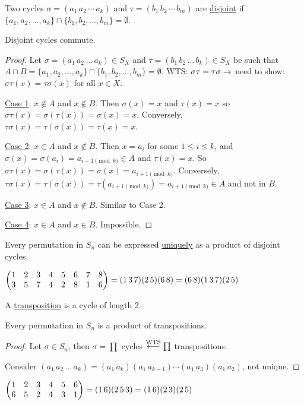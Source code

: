 \documentclass[]{article}
\begin{document}
\begin{definition}
	Two cycles $\sigma = (a_1\, a_2\,\cdots\, a_k)$ and $\tau = (b_1\,b_2\,\cdots\,b_m)$ are \ul{disjoint} if $\{a_1,a_2,\dots,a_k\}\cap \{b_1,b_2,\dots,b_m\} = \emptyset$.
\end{definition}

\begin{proposition}
	Disjoint cycles commute.
\end{proposition}
\begin{proof}
	Let $\sigma = (a_1\,a_2\,\dots\,a_k)\in S_X$ and $\tau = (b_1\,b_2\,\dots\,b_k)\in S_X$ be such that $A\cap B = \{a_1,a_2,\dots,a_k\}\cap \{b_1,b_2,\dots,b_m\} = \emptyset$.
	WTS: $\sigma\tau = \tau\sigma \rightarrow$ need to show: $\sigma\tau(x) = \tau\sigma(x)$ for all $x\in X$.

	\ul{Case 1}: $x\notin A$ and $x\notin B$. Then $\sigma(x) = x$ and $\tau(x) = x$ so $\sigma\tau(x) = \sigma(\tau(x)) = \sigma(x) = x$. Conversely, $\tau\sigma(x) = \tau(\sigma(x)) = \tau(x) = x$.

	\ul{Case 2}: $x\in A$ and $x\notin B$. Then $x = a_i$ for some $1\leq i\leq k$, and $\sigma(x) = \sigma(a_i) = a_{i+1\pmod k}\in A$ and $\tau(x) = x$. So $\sigma\tau(x) = \sigma(\tau(x)) = \sigma(x) = a_{i+1\pmod k}$. Conversely, $\tau\sigma(x) = \tau(\sigma(x)) = \tau(a_{i+1\pmod k}) = a_{i+1\pmod k}\in A$ and not in $B$.

	\ul{Case 3}: $x\in A$ and $x\notin B$. Similar to Case 2.

	\ul{Case 4}: $x\in A$ and $x\in B$. Impossible.
\end{proof}

\begin{theorem}
	Every permutation in $S_n$ can be expressed \ul{uniquely} as a product of disjoint cycles.
\end{theorem}
\begin{example}
	$\begin{pmatrix}1&2&3&4&5&6&7&8\\3&5&7&4&2&8&1&6\end{pmatrix} = (1\,3\,7)(2\,5)(6\,8) = (6\,8)(1\,3\,7)(2\,5)$
\end{example}
\begin{definition}
	A \ul{transposition} is a cycle of length 2.
\end{definition}
\begin{proposition}
	Every permutation in $S_n$ is a product of transpositions.
\end{proposition}
\begin{proof}
	Let $\sigma\in S_n$, then $\sigma = \prod$ cycles $\overset{\text{WTS}}{\longleftarrow} \prod$ transpositions.
	
	Consider $(a_1\,a_2\,\dots\,a_k) = (a_1\,a_k)(a_1\,a_{k-1})\cdots(a_1\,a_3)(a_1\,a_2)$, not unique.
\end{proof}
\begin{example}
	$\begin{pmatrix}1&2&3&4&5&6\\6&5&2&4&3&1\end{pmatrix} = (1\,6)(2\,5\,3) = (1\,6)(2\,3)(2\,5)$
\end{example}
\end{document}
